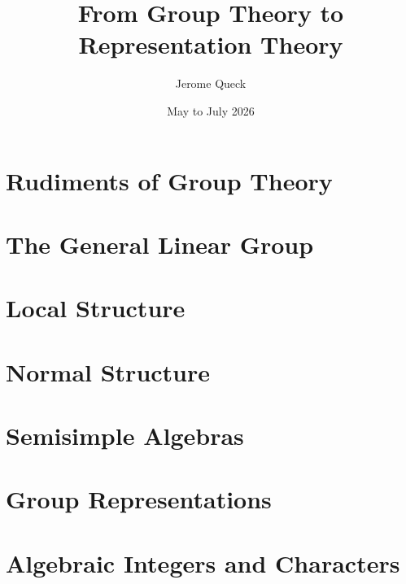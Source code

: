 \documentclass[oneside,openany]{book}
\title{From Group Theory to Representation Theory}
\author{Jerome Queck}
\date{May to July 2026}
\begin{document}
\maketitle
\tableofcontents

\chapter{Rudiments of Group Theory}

\newpage

\newpage


\chapter{The General Linear Group}

\newpage

\newpage


\chapter{Local Structure}

\newpage

\newpage


\chapter{Normal Structure}

\newpage


\chapter{Semisimple Algebras}

\newpage


\chapter{Group Representations}

\newpage

\newpage


\appendix
\chapter{Algebraic Integers and Characters}

\end{document}
